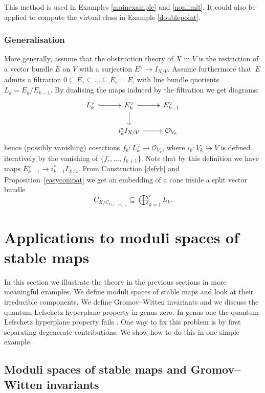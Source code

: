 \documentclass[pdftex]{sigma}
\numberwithin{equation}{section}
\newcommand{\OO}{\mathcal{O}}
\theoremstyle{plain}
\theoremstyle{definition}
\theoremstyle{remark}
\begin{document}
This method is used in Examples \ref{mainexample} and \ref{nonlimit}. It could also be applied to compute the virtual class in Example \ref{doublepoint}.
\subsubsection{Generalisation}
More generally, assume that the obstruction theory of $X$ in $V$ is the restriction of a vector bundle $E$ on $V$ with a surjection $E^\vee\to I_{X/V}$. Assume furthermore that~$E$ admits a filtration $0\subseteq E_1\subseteq\dots \subseteq E_r=E$, with line bundle quotients $L_k=E_k/E_{k-1}$. By dualising the maps induced by the filtration we get diagrams:
\[\begin{tikzcd}
L_k^\vee \ar[r,hook] & E_k^\vee \ar[r,two heads]\ar[d] & E_{k-1}^\vee \\
& i_k^*I_{X/V}\ar[r] & \OO_{V_k}
\end{tikzcd}
\]
hence (possibly vanishing) cosections $f_k\colon L_k^\vee\to \OO_{V_k}$, where $i_k\colon V_k\hookrightarrow V$ is defined iteratively by the vanishing of $\{f_r,\ldots,f_{k+1}\}$. Note that by this definition we have maps $E_{k-1}^\vee\to i_{k-1}^*I_{X/V}$. From Construction \ref{defvb} and Proposition~\ref{easycompat} we get an embedding of a cone inside a split vector bundle \[C_{X/C_{V_1/\ldots_{/C_{V_{r-1}/V}}}}\subseteq \bigoplus_{k=1}^r L_k.\]

\section{Applications to moduli spaces of stable maps}\label{applications}
In this section we illustrate the theory in the previous sections in more meaningful examples. We define moduli spaces of stable maps and look at their irreducible components. We define Gromov--Witten invariants and we discuss the quantum Lefschetz hyperplane property in genus zero. In genus one the quantum Lefschetz hyperplane property fails \cite{coates2012}. One way to fix this problem is by first separating degenerate contributions. We show how to do this in one simple example.

\subsection{Moduli spaces of stable maps and Gromov--Witten invariants}
\end{document}

